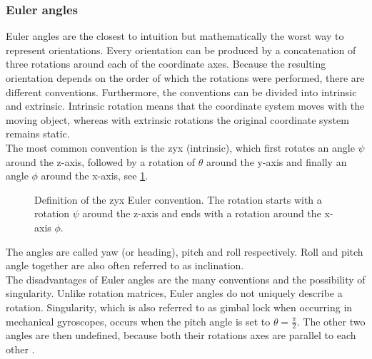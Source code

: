 \subsubsection{Euler angles}
Euler angles are the closest to intuition but mathematically the worst way to represent orientations.
Every orientation can be produced by a concatenation of three rotations around each of the coordinate axes.
Because the resulting orientation depends on the order of which the rotations were performed, there are different conventions.
Furthermore, the conventions can be divided into intrinsic and extrinsic.
Intrinsic rotation means that the coordinate system moves with the moving object, whereas with extrinsic rotations the original coordinate system remains static.\\
The most common convention is the zyx (intrinsic), which first rotates an angle $\psi$ around the z-axis, followed by a rotation of $\theta$ around the y-axis and finally an angle $\phi$ around the x-axis, see \cref{fig:tikz_euler_angles}.
\begin{figure}[htpb]
    \centering
    
    \caption{Definition of the zyx Euler convention. The rotation starts with a rotation $\psi$ around the z-axis and ends with a rotation around the x-axis $\phi$.}
    \label{fig:tikz_euler_angles}
\end{figure}

The angles are called yaw (or heading), pitch and roll respectively. Roll and pitch angle together are also often referred to as inclination.\\
The disadvantages of Euler angles are the many conventions and the possibility of singularity.
Unlike rotation matrices, Euler angles do not uniquely describe a rotation.
Singularity, which is also referred to as gimbal lock when occurring in mechanical gyroscopes, occurs when the pitch angle is set to $\theta = \frac{\pi}{2}$.
The other two angles are then undefined, because both their rotations axes are parallel to each other \cite{Kok2017}.

